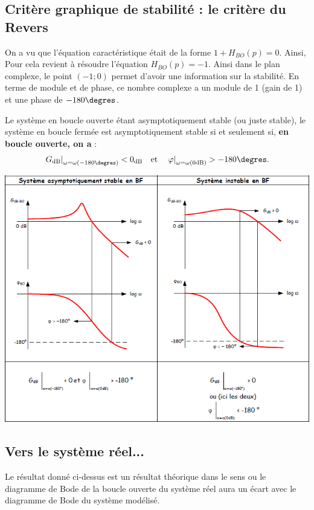 \documentclass[10pt,fleqn]{article} %
\begin{document}
\subsection{Critère graphique de stabilité : le critère du Revers}
 On a vu que l'équation caractéristique était de la forme $1+H_{BO}(p)=0$. Ainsi, Pour cela revient à résoudre l'équation $H_{BO}(p)=-1$. Ainsi dans le plan complexe, le point $(-1;0)$ permet d'avoir une information sur la stabilité. En terme de module et de phase, ce nombre complexe a un module de 1 (gain de 1) et une phase de $-180\degres$.
 
\begin{resultat}
Le système en boucle ouverte étant asymptotiquement stable (ou juste stable), le système en boucle fermée est asymptotiquement stable si et seulement si, \textbf{en boucle ouverte, on a} :
$$
\left. G_{\text{dB}} \right|_{\omega=\omega(-180\degres)}<0_{\text{dB}} 
\quad
\text{et}
\quad
\left. \varphi \right|_{\omega=\omega(0\text{dB})}>-180\degres.
$$
\end{resultat}
 
 
\begin{center}
\includegraphics[width=.9\linewidth]{images/marges}
\end{center} 
\subsection{Vers le système réel...}

Le résultat donné ci-dessus est un résultat théorique dans le sens ou le diagramme de Bode de la boucle ouverte du système réel aura un écart avec le diagramme de Bode du système modélisé. 
\end{document}
